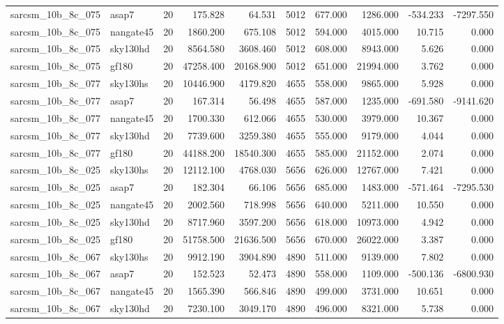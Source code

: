 \begin{longtable}{llrrrrrrrr}
sarcsm\_10b\_8c\_075 & asap7 & 20 & 175.828 & 64.531 & 5012 & 677.000 & 1286.000 & -534.233 & -7297.550 \\
sarcsm\_10b\_8c\_075 & nangate45 & 20 & 1860.200 & 675.108 & 5012 & 594.000 & 4015.000 & 10.715 & 0.000 \\
sarcsm\_10b\_8c\_075 & sky130hd & 20 & 8564.580 & 3608.460 & 5012 & 608.000 & 8943.000 & 5.626 & 0.000 \\
sarcsm\_10b\_8c\_075 & gf180 & 20 & 47258.400 & 20168.900 & 5012 & 651.000 & 21994.000 & 3.762 & 0.000 \\
sarcsm\_10b\_8c\_077 & sky130hs & 20 & 10446.900 & 4179.820 & 4655 & 558.000 & 9865.000 & 5.928 & 0.000 \\
sarcsm\_10b\_8c\_077 & asap7 & 20 & 167.314 & 56.498 & 4655 & 587.000 & 1235.000 & -691.580 & -9141.620 \\
sarcsm\_10b\_8c\_077 & nangate45 & 20 & 1700.330 & 612.066 & 4655 & 530.000 & 3979.000 & 10.367 & 0.000 \\
sarcsm\_10b\_8c\_077 & sky130hd & 20 & 7739.600 & 3259.380 & 4655 & 555.000 & 9179.000 & 4.044 & 0.000 \\
sarcsm\_10b\_8c\_077 & gf180 & 20 & 44188.200 & 18540.300 & 4655 & 585.000 & 21152.000 & 2.074 & 0.000 \\
sarcsm\_10b\_8c\_025 & sky130hs & 20 & 12112.100 & 4768.030 & 5656 & 626.000 & 12767.000 & 7.421 & 0.000 \\
sarcsm\_10b\_8c\_025 & asap7 & 20 & 182.304 & 66.106 & 5656 & 685.000 & 1483.000 & -571.464 & -7295.530 \\
sarcsm\_10b\_8c\_025 & nangate45 & 20 & 2002.560 & 718.998 & 5656 & 640.000 & 5211.000 & 10.550 & 0.000 \\
sarcsm\_10b\_8c\_025 & sky130hd & 20 & 8717.960 & 3597.200 & 5656 & 618.000 & 10973.000 & 4.942 & 0.000 \\
sarcsm\_10b\_8c\_025 & gf180 & 20 & 51758.500 & 21636.500 & 5656 & 670.000 & 26022.000 & 3.387 & 0.000 \\
sarcsm\_10b\_8c\_067 & sky130hs & 20 & 9912.190 & 3904.890 & 4890 & 511.000 & 9139.000 & 7.802 & 0.000 \\
sarcsm\_10b\_8c\_067 & asap7 & 20 & 152.523 & 52.473 & 4890 & 558.000 & 1109.000 & -500.136 & -6800.930 \\
sarcsm\_10b\_8c\_067 & nangate45 & 20 & 1565.390 & 566.846 & 4890 & 499.000 & 3731.000 & 10.651 & 0.000 \\
sarcsm\_10b\_8c\_067 & sky130hd & 20 & 7230.100 & 3049.170 & 4890 & 496.000 & 8321.000 & 5.738 & 0.000 \\

\end{longtable}
